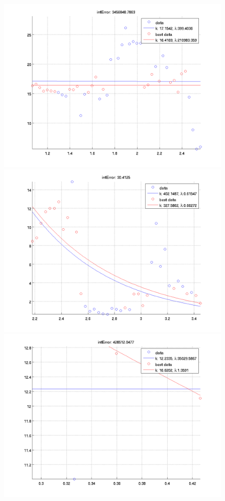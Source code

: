 \documentclass[12pt]{report}
\begin{document}
\begin{figure}[H]
\begin{minipage}[t]{0.5\linewidth}
\end{minipage}
\begin{minipage}[t]{0.5\linewidth}
	\centering
	\includegraphics[scale=\imFeatBW]{images/worst2}\\
	\includegraphics[scale=\imFeatBW]{images/worst4}\\
	\includegraphics[scale=\imFeatBW]{images/worst6}\\

\end{minipage}
\end{figure}
\end{document}
